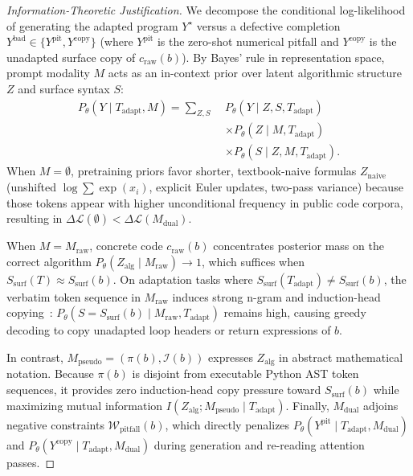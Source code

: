 \documentclass[10pt,twocolumn]{article}
\begin{document}
\begin{proof}[Information-Theoretic Justification]
We decompose the conditional log-likelihood of generating the adapted program $Y^{\star}$ versus a defective completion $Y^{\text{bad}} \in \{Y^{\text{pit}}, Y^{\text{copy}}\}$ (where $Y^{\text{pit}}$ is the zero-shot numerical pitfall and $Y^{\text{copy}}$ is the unadapted surface copy of $c_{\text{raw}}(b)$). By Bayes' rule in representation space, prompt modality $M$ acts as an in-context prior over latent algorithmic structure $Z$ and surface syntax $S$:
\begin{equation}
\begin{aligned}
    P_\theta(Y \mid T_{\text{adapt}}, M) = \sum_{Z, S}\;& P_\theta(Y \mid Z, S, T_{\text{adapt}}) \\
    &\times P_\theta(Z \mid M, T_{\text{adapt}}) \\
    &\times P_\theta(S \mid Z, M, T_{\text{adapt}}).
\end{aligned}
\end{equation}
When $M = \emptyset$, pretraining priors favor shorter, textbook-naive formulas $Z_{\text{naive}}$ (unshifted $\log \sum \exp(x_i)$, explicit Euler updates, two-pass variance) because those tokens appear with higher unconditional frequency in public code corpora, resulting in $\Delta \mathcal{L}(\emptyset) < \Delta \mathcal{L}(M_{\text{dual}})$.

When $M = M_{\text{raw}}$, concrete code $c_{\text{raw}}(b)$ concentrates posterior mass on the correct algorithm $P_\theta(Z_{\text{alg}} \mid M_{\text{raw}}) \to 1$, which suffices when $S_{\text{surf}}(T) \approx S_{\text{surf}}(b)$. On adaptation tasks where $S_{\text{surf}}(T_{\text{adapt}}) \neq S_{\text{surf}}(b)$, the verbatim token sequence in $M_{\text{raw}}$ induces strong n-gram and induction-head copying~\cite{olsson2022context}: $P_\theta(S = S_{\text{surf}}(b) \mid M_{\text{raw}}, T_{\text{adapt}})$ remains high, causing greedy decoding to copy unadapted loop headers or return expressions of $b$.

In contrast, $M_{\text{pseudo}} = (\pi(b), \mathcal{I}(b))$ expresses $Z_{\text{alg}}$ in abstract mathematical notation. Because $\pi(b)$ is disjoint from executable Python AST token sequences, it provides zero induction-head copy pressure toward $S_{\text{surf}}(b)$ while maximizing mutual information $I(Z_{\text{alg}}; M_{\text{pseudo}} \mid T_{\text{adapt}})$. Finally, $M_{\text{dual}}$ adjoins negative constraints $\mathcal{W}_{\text{pitfall}}(b)$, which directly penalizes $P_\theta(Y^{\text{pit}} \mid T_{\text{adapt}}, M_{\text{dual}})$ and $P_\theta(Y^{\text{copy}} \mid T_{\text{adapt}}, M_{\text{dual}})$ during generation and re-reading attention passes.
\end{proof}
\end{document}
